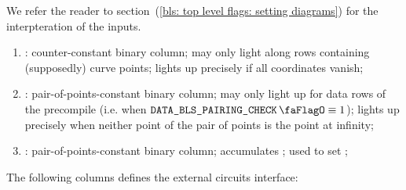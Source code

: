 We refer the reader to section~(\ref{bls: top level flags: setting diagrams}) for the interpteration of the inputs.
\begin{enumerate}[resume]
    \item
        \isInfinity:
        counter-constant binary column;
        may only light along rows containing (supposedly) curve points;
        lights up precisely if all coordinates vanish;
    \item
        \both{\nontrivialPairOfPointsBit}:
        pair-of-points-constant binary column;
        may only light up for data rows of the \instBlsPairingCheck{} precompile (i.e. when $\isBlsPairingCheckData \equiv 1$);
        lights up precisely when neither point of the pair of points is the point at infinity;
    \item
        \both{\nontrivialPairOfPointsAcc}:
        pair-of-points-constant binary column;
        accumulates \nontrivialPairOfPointsBit{};
        used to set \wellformedDataNontrivial{};
\end{enumerate}
The following columns defines the external circuits interface:
